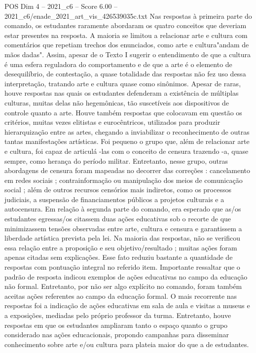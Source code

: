 \begin{textsample}{POS Dim 4 – 2021\_c6 – Score 6.00 – 2021\_c6/enade\_2021\_art\_vis\_426539035c.txt}
Nas respostas à primeira parte do comando, os estudantes raramente abordaram os quatro conceitos que deveriam estar presentes na resposta.
A maioria se limitou a relacionar arte e cultura com comentários que repetiam trechos dos enunciados, como arte e cultura"andam de mãos dadas".
Assim, apesar de o Texto I sugerir o entendimento de que a cultura é uma esfera reguladora do comportamento e de que a arte é o elemento de desequilíbrio, de contestação, a quase totalidade das respostas não fez uso dessa interpretação, tratando arte e cultura quase como sinônimos.
Apesar de raras, houve respostas nas quais os estudantes defenderam a existência de múltiplas culturas, muitas delas não hegemônicas, tão suscetíveis aos dispositivos de controle quanto a arte.
Houve também respostas que colocavam em questão os critérios, muitas vezes elitistas e eurocêntricos, utilizados para produzir hierarquização entre as artes, chegando a inviabilizar o reconhecimento de outras tantas manifestações artísticas.
Foi pequeno o grupo que, além de relacionar arte e cultura, foi capaz de articulá -las com o conceito de censura trazendo -a, quase sempre, como herança do período militar.
Entretanto, nesse grupo, outras abordagens de censura foram mapeadas no decorrer das correções : cancelamento em redes sociais ; contrainformação ou manipulação dos meios de comunicação social ; além de outros recursos censórios mais indiretos, como os processos judiciais, a suspensão de financiamentos públicos a projetos culturais e a autocensura.
Em relação à segunda parte do comando, era esperado que as/os estudantes egressas/os citassem duas ações educativas sob o recorte de que minimizassem tensões observadas entre arte, cultura e censura e garantissem a liberdade artística prevista pela lei.
Na maioria das respostas, não se verificou essa relação entre a proposição e seu objetivo/resultado ; muitas ações foram apenas citadas sem explicações.
Esse fato reduziu bastante a quantidade de respostas com pontuação integral no referido item.
Importante ressaltar que o padrão de resposta indicou exemplos de ações educativas no campo da educação não formal.
Entretanto, por não ser algo explícito no comando, foram também aceitas ações referentes ao campo da educação formal.
O mais recorrente nas respostas foi a indicação de ações educativas em sala de aula e visitas a museus e a exposições, mediadas pelo próprio professor da turma.
Entretanto, houve respostas em que os estudantes ampliaram tanto o espaço quanto o grupo considerado nas ações educacionais, propondo campanhas para disseminar conhecimento sobre arte e/ou cultura para plateia maior do que a de estudantes.

\end{textsample}
